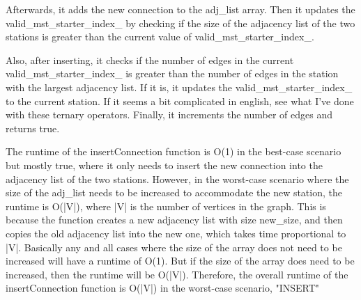 			Afterwards, it adds the new connection to the {\color{draculapurple}adj\_list} array. Then it updates the {\color{draculapurple}valid\_mst\_starter\_index\_}
			by checking if the size of the adjacency list of the two stations is greater than the current value of {\color{draculapurple}valid\_mst\_starter\_index\_}.

			Also, after inserting, it checks if the number of edges in the current {valid\_mst\_starter\_index\_} is greater than the number of edges in the station with the largest adjacency list. If it is, it updates the {\color{draculapurple}valid\_mst\_starter\_index\_} to the current station.
			If it seems a bit complicated in english, see what I've done with these ternary operators.
			\newline
			\newline
			Finally, it increments the number of edges and returns {\color{draculapurple}true}.

			The runtime of the {\color{draculapurple}insertConnection} function is {\color{lightblue}O(1)} in the best-case scenario but mostly true, 
			where it only needs to insert the new connection into the adjacency list of the two stations. However, in the worst-case scenario where the 
			size of the {\color{draculapurple}adj\_list} needs to be increased to accommodate the new station, the runtime is {\color{lightblue}O(|V|)}, 
			where {\color{draculapurple}|V|} is the number of vertices in the graph. This is because the function creates a new adjacency list with size 
			{\color{draculapurple}new\_size}, and then copies the old adjacency list into the new one, which takes time proportional to {\color{draculapurple}|V|}.	
			Basically any and all cases where the size of the array does not need to be increased will have a runtime of {\color{lightblue}O(1)}.
			But if the size of the array does need to be increased, then the runtime will be {\color{lightblue}O(|V|)}.
			Therefore, the overall runtime of the {\color{draculapurple}insertConnection} function is {\color{lightblue}O(|V|)} in the worst-case scenario,
			{\color{GoldenYellow}"INSERT"}


